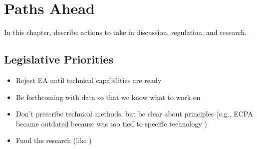 \chapter{Paths Ahead}
\label{chap-pathsahead}
















In this chapter, describe actions to take in discussion, regulation, and research.

\section{Legislative Priorities}

\begin{itemize}
    \item Reject EA until technical capabilities are ready \cite{varia_2018}
    \item Be forthcoming with data so that we know what to work on \cite{devlin_2018}
    \item Don't prescribe technical methods, but be clear about principles \cite{matyas_incommensurability_2018}
        (e.g., ECPA became outdated because was too tied to specific technology \cite{shamsi_2011})
    \item Fund the research \cite{varia_2018} (like \cite{goss_hr2616_1999})
\end{itemize}

